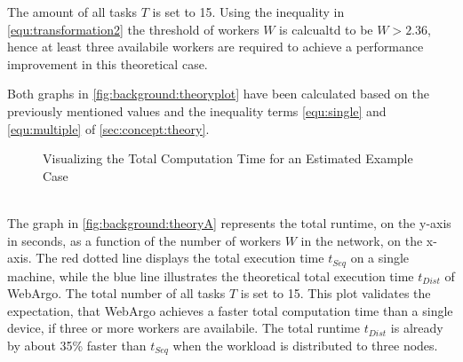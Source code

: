The amount of all tasks $T$ is set to 15. Using the inequality in \eqref{equ:transformation2} the threshold of workers $W$ is calcualtd to be $W > 2.36$, hence at least three availabile workers are required to achieve a performance improvement in this theoretical case.

Both graphs in \autoref{fig:background:theoryplot} have been calculated based on the previously mentioned values and the inequality terms \eqref{equ:single} and \eqref{equ:multiple} of \autoref{sec:concept:theory}.
\begin{figure}[htbp]
  \myfloatalign
   \caption{Visualizing the Total Computation Time for an Estimated Example Case}
   \label{fig:background:theoryplot}
\end{figure}
~\\
The graph in \autoref{fig:background:theoryA} represents the total runtime, on the y-axis in seconds, as a function of the number of workers $W$ in the network, on the x-axis. The red dotted line displays the total execution time $t_{Seq}$ on a single machine, while the blue line illustrates the theoretical total execution time $t_{Dist}$ of WebArgo. The total number of all tasks $T$ is set to 15. This plot validates the expectation, that WebArgo achieves a faster total computation time than a single device, if three or more workers are availabile. The total runtime $t_{Dist}$ is already by about 35\% faster than $t_{Seq}$ when the workload is distributed to three nodes. 

